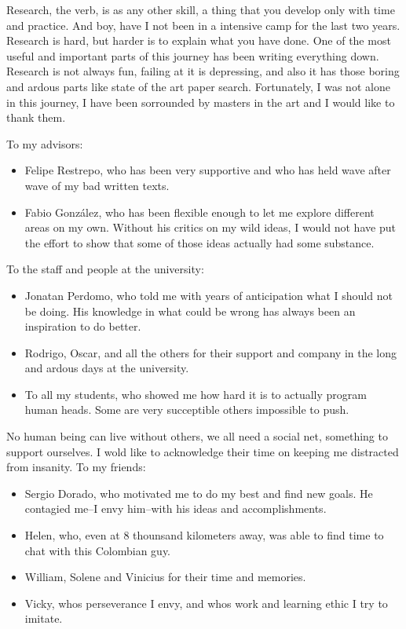 \documentclass[
11pt, %
english, %
singlespacing, %
headsepline, %
]{MastersDoctoralThesis} %
\providecommand{\tightlist}{%
  \setlength{\itemsep}{0pt}\setlength{\parskip}{0pt}}
\begin{document}
\begin{acknowledgements}
\addchaptertocentry{\acknowledgementname} %

Research, the verb, is as any other skill, a thing that you develop only with time and
practice. And boy, have I not been in a intensive camp for the last two years. Research is
hard, but harder is to explain what you have done. One of the most useful and important
parts of this journey has been writing everything down.  Research is not always fun,
failing at it is depressing, and also it has those boring and ardous parts like state of
the art paper search. Fortunately, I was not alone in this journey, I have been sorrounded
by masters in the art and I would like to thank them.

To my advisors:

\begin{itemize}
\tightlist
\item Felipe Restrepo, who has been very supportive and who has held wave after wave of my
  bad written texts.
\item Fabio González, who has been flexible enough to let me explore different areas on my
  own. Without his critics on my wild ideas, I would not have put the effort to show that
  some of those ideas actually had some substance.
\end{itemize}

To the staff and people at the university:

\begin{itemize}
\tightlist
\item Jonatan Perdomo, who told me with years of anticipation what I should not be doing.
  His knowledge in what could be wrong has always been an inspiration to do better.
\item Rodrigo, Oscar, and all the others for their support and company in the long and
  ardous days at the university.
\item To all my students, who showed me how hard it is to actually program human heads.
  Some are very succeptible others impossible to push.
\end{itemize}

No human being can live without others, we all need a social net, something to support
ourselves. I wold like to acknowledge their time on keeping me distracted from insanity.
To my friends:

\begin{itemize}
\tightlist
\item Sergio Dorado, who motivated me to do my best and find new goals. He contagied me--I
  envy him--with his ideas and accomplishments.
\item Helen, who, even at 8 thounsand kilometers away, was able to find time to chat
  with this Colombian guy.
\item William, Solene and Vinicius for their time and memories.
\item Vicky, whos perseverance I envy, and whos work and learning ethic I try to imitate.
\end{itemize}


\end{acknowledgements}
\end{document}
